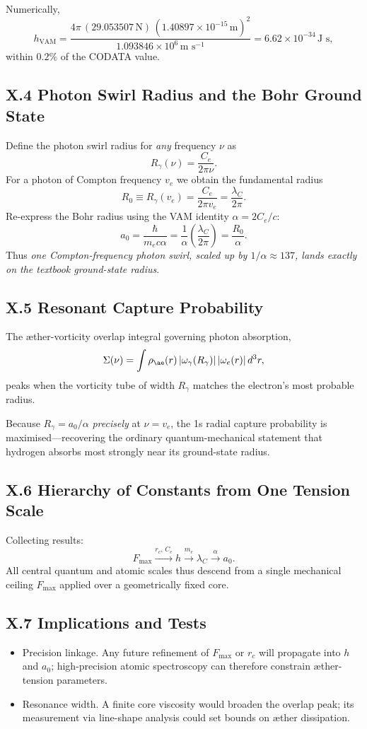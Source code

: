 \documentclass[11pt]{article}
\begin{document}
Numerically,
\[
h_{\text{VAM}} = \frac{4\pi\,(29.053507\,\text{N})\,(1.40897\times10^{-15}\,\text{m})^2}{1.093846\times10^{6}\,\text{m s}^{-1}} = 6.62\times10^{-34}\,\text{J s},
\]
within $0.2\%$ of the CODATA value.

\subsection*{X.4 Photon Swirl Radius and the Bohr Ground State}

Define the photon swirl radius for \textit{any} frequency $\nu$ as
\[
R_{\gamma}(\nu) = \frac{C_e}{2\pi\nu}.
\]
For a photon of Compton frequency $v_e$ we obtain the fundamental radius
\[
R_0 \equiv R_{\gamma}(v_e) = \frac{C_e}{2\pi v_e} = \frac{\lambda_C}{2\pi}.
\]
Re-express the Bohr radius using the VAM identity $\alpha = 2C_e/c$:
\[
a_0 = \frac{\hbar}{m_e c \alpha} = \frac{1}{\alpha} \left( \frac{\lambda_C}{2\pi} \right) = \frac{R_0}{\alpha}. \tag{X.2}
\]
Thus \textit{one Compton-frequency photon swirl, scaled up by $1/\alpha \approx 137$, lands exactly on the textbook ground-state radius}.

\subsection*{X.5 Resonant Capture Probability}

The \ae ther-vorticity overlap integral governing photon absorption,
\[
\Sigma(\nu) = \int \rho_{\ae}(r)\,|\omega_{\gamma}(R_{\gamma})|\,|\omega_e(r)|\,d^3r,
\]
peaks when the vorticity tube of width $R_{\gamma}$ matches the electron's most probable radius.

Because $R_{\gamma} = a_0/\alpha$ \textit{precisely} at $\nu = v_e$, the 1s radial capture probability is maximised---recovering the ordinary quantum-mechanical statement that hydrogen absorbs most strongly near its ground-state radius.

\subsection*{X.6 Hierarchy of Constants from One Tension Scale}

Collecting results:
\[
F_{\max} \xrightarrow{r_c,\,C_e} \boxed{h} \xrightarrow{m_e} \lambda_C \xrightarrow{\alpha} a_0.
\]
All central quantum and atomic scales thus descend from a single mechanical ceiling $F_{\max}$ applied over a geometrically fixed core.

\subsection*{X.7 Implications and Tests}

\begin{itemize}
    \item Precision linkage. Any future refinement of $F_{\max}$ or $r_c$ will propagate into $h$ and $a_0$; high-precision atomic spectroscopy can therefore constrain \ae ther-tension parameters.
    \item Resonance width. A finite core viscosity would broaden the overlap peak; its measurement via line-shape analysis could set bounds on \ae ther dissipation.
\end{itemize}


\newpage
\end{document}

